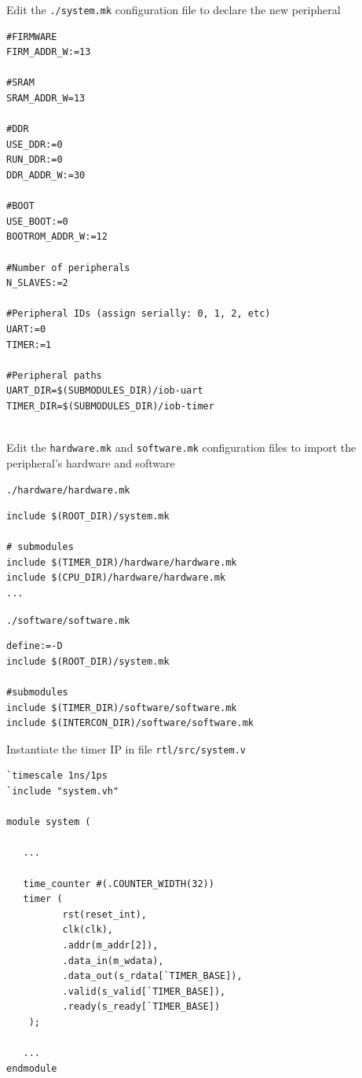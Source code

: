 \documentclass [xcolor=svgnames, t] {beamer}
\begin{document}
\begin{frame}[fragile]{Edit the {\tt ./system.mk} configuration file to declare the new peripheral}
\begin{tiny}
\begin{lstlisting}
#FIRMWARE
FIRM_ADDR_W:=13

#SRAM
SRAM_ADDR_W=13

#DDR
USE_DDR:=0
RUN_DDR:=0
DDR_ADDR_W:=30

#BOOT
USE_BOOT:=0
BOOTROM_ADDR_W:=12

#Number of peripherals
N_SLAVES:=2

#Peripheral IDs (assign serially: 0, 1, 2, etc)
UART:=0
TIMER:=1

#Peripheral paths
UART_DIR=$(SUBMODULES_DIR)/iob-uart
TIMER_DIR=$(SUBMODULES_DIR)/iob-timer


\end{lstlisting}
\end{tiny}
\end{frame}

\begin{frame}[fragile]{Edit the {\tt hardware.mk} and {\tt software.mk} configuration files to import the peripheral's hardware and software}

  {\tt ./hardware/hardware.mk}
  \begin{tiny}
    
    \begin{lstlisting}
include $(ROOT_DIR)/system.mk

# submodules
include $(TIMER_DIR)/hardware/hardware.mk
include $(CPU_DIR)/hardware/hardware.mk
...
    \end{lstlisting}
  \end{tiny}

  {\tt ./software/software.mk}
  \begin{tiny}
    \begin{lstlisting}
define:=-D
include $(ROOT_DIR)/system.mk

#submodules
include $(TIMER_DIR)/software/software.mk
include $(INTERCON_DIR)/software/software.mk
    \end{lstlisting}
  \end{tiny}
\end{frame}


\begin{frame}[fragile]{Instantiate the timer IP in file {\tt rtl/src/system.v}}
\begin{tiny}
\begin{lstlisting}
`timescale 1ns/1ps
`include "system.vh"

module system (

   ...

   time_counter #(.COUNTER_WIDTH(32))
   timer (
          rst(reset_int),
          clk(clk),
          .addr(m_addr[2]),
          .data_in(m_wdata),
          .data_out(s_rdata[`TIMER_BASE]),
          .valid(s_valid[`TIMER_BASE]),
          .ready(s_ready[`TIMER_BASE])
    );

   ...
endmodule
\end{lstlisting}
\end{tiny}
\end{frame}
\end{document}
